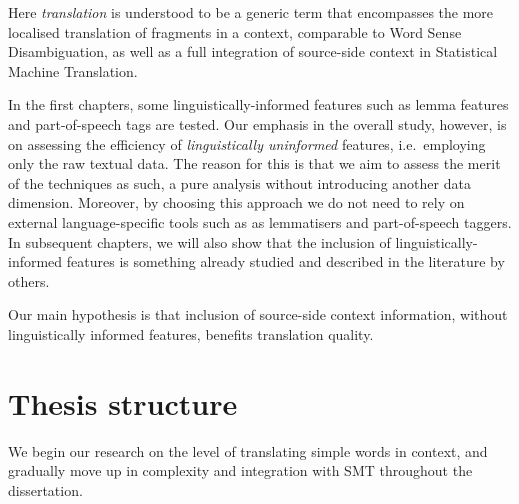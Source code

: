 Here \emph{translation} is understood to be a generic term that
encompasses the more localised translation of fragments in a
context, comparable to Word Sense Disambiguation, as well as a full integration
of source-side context in Statistical Machine Translation.

In the first chapters, some linguistically-informed features such as lemma
features and part-of-speech tags are tested. Our emphasis in the overall study,
however, is on assessing the efficiency of \emph{linguistically uninformed}
features, i.e.\ employing only the raw textual data. The reason for this is that we
aim to assess the merit of the techniques as such, a pure analysis without
introducing another data dimension. Moreover, by choosing this approach we do
not need to rely on external language-specific tools such as as lemmatisers and
part-of-speech taggers. In subsequent chapters, we will also show that the
inclusion of linguistically-informed features is something already studied and
described in the literature by others.

Our main hypothesis is that inclusion of source-side context information, without
linguistically informed features, benefits translation quality.

\section{Thesis structure}

We begin our research on the level of translating simple words in context, and
gradually move up in complexity and integration with SMT throughout the
dissertation.

